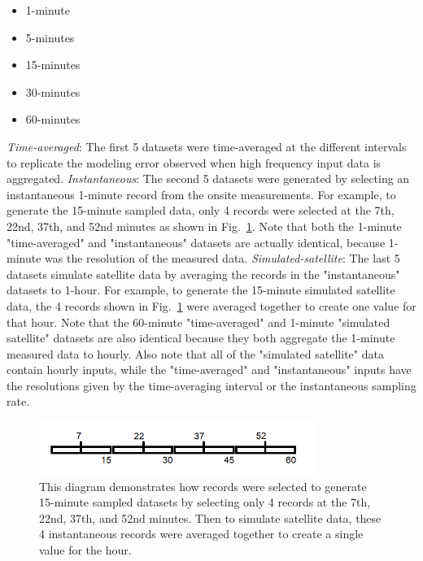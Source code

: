 \documentclass[conference]{IEEEtran}
\begin{document}
\begin{itemize}
    \item 1-minute
    \item 5-minutes
    \item 15-minutes
    \item 30-minutes
    \item 60-minutes
\end{itemize}

\emph{Time-averaged}: The first 5 datasets were time-averaged at the different intervals to replicate the modeling error observed when high frequency input data is aggregated. \emph{Instantaneous}: The second 5 datasets were generated by selecting an instantaneous 1-minute record from the onsite measurements. For example, to generate the 15-minute sampled data, only 4 records were selected at the 7th, 22nd, 37th, and 52nd minutes as shown in Fig.~\ref{fig:sampling-diagram}. Note that both the 1-minute "time-averaged" and "instantaneous" datasets are actually identical, because 1-minute was the resolution of the measured data. \emph{Simulated-satellite}: The last 5 datasets simulate satellite data by averaging the records in the "instantaneous" datasets to 1-hour. For example, to generate the 15-minute simulated satellite data, the 4 records shown in Fig.~\ref{fig:sampling-diagram} were averaged together to create one value for that hour. Note that the 60-minute "time-averaged" and 1-minute "simulated satellite" datasets are also identical because they both aggregate the 1-minute measured data to hourly. Also note that all of the "simulated satellite" data contain hourly inputs, while the "time-averaged" and "instantaneous" inputs have the resolutions given by the time-averaging interval or the instantaneous sampling rate.

\begin{figure}[htbp]
\centerline{\includegraphics[width=9cm]{sampling-diagram.png}}
\caption{This diagram demonstrates how records were selected to generate 15-minute sampled datasets by selecting only 4 records at the 7th, 22nd, 37th, and 52nd minutes. Then to simulate satellite data, these 4 instantaneous records were averaged together to create a single value for the hour.}
\label{fig:sampling-diagram}
\end{figure}
\end{document}

